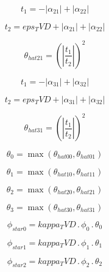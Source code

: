 \documentclass{article}
\begin{document}
\begin{dmath}t_{1} = - \left|{\alpha_{21}}\right| + \left|{\alpha_{22}}\right|\end{dmath}

\begin{dmath}t_{2} = eps_TVD + \left|{\alpha_{21}}\right| + \left|{\alpha_{22}}\right|\end{dmath}

\begin{dmath}\theta_{hat 21} = \left(\left|{\frac{t_{1}}{t_{2}}}\right| \right)^{2}\end{dmath}

\begin{dmath}t_{1} = - \left|{\alpha_{31}}\right| + \left|{\alpha_{32}}\right|\end{dmath}

\begin{dmath}t_{2} = eps_TVD + \left|{\alpha_{31}}\right| + \left|{\alpha_{32}}\right|\end{dmath}

\begin{dmath}\theta_{hat 31} = \left(\left|{\frac{t_{1}}{t_{2}}}\right| \right)^{2}\end{dmath}

\begin{dmath}\theta_{0} = \max\left(\theta_{hat 00}, \theta_{hat 01}\right)\end{dmath}

\begin{dmath}\theta_{1} = \max\left(\theta_{hat 10}, \theta_{hat 11}\right)\end{dmath}

\begin{dmath}\theta_{2} = \max\left(\theta_{hat 20}, \theta_{hat 21}\right)\end{dmath}

\begin{dmath}\theta_{3} = \max\left(\theta_{hat 30}, \theta_{hat 31}\right)\end{dmath}

\begin{dmath}\phi_{star 0} = kappa_TVD \,.\, \phi_{0} \,.\, \theta_{0}\end{dmath}

\begin{dmath}\phi_{star 1} = kappa_TVD \,.\, \phi_{1} \,.\, \theta_{1}\end{dmath}

\begin{dmath}\phi_{star 2} = kappa_TVD \,.\, \phi_{2} \,.\, \theta_{2}\end{dmath}
\end{document}

